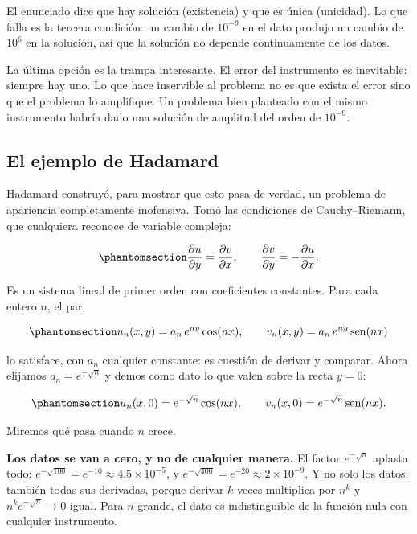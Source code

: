 \documentclass[
  spanish,
  a4paper,
]{scrbook}
\theoremstyle{definition}
\theoremstyle{plain}
\theoremstyle{definition}
\theoremstyle{plain}
\theoremstyle{definition}
\theoremstyle{remark}
\begin{document}
El enunciado dice que hay solución (existencia) y que es única
(unicidad). Lo que falla es la tercera condición: un cambio de
\(10^{-9}\) en el dato produjo un cambio de \(10^{6}\) en la solución,
así que la solución no depende continuamente de los datos.

La última opción es la trampa interesante. El error del instrumento es
inevitable: siempre hay uno. Lo que hace inservible al problema no es
que exista el error sino que el problema lo amplifique. Un problema bien
planteado con el mismo instrumento habría dado una solución de amplitud
del orden de \(10^{-9}\).

\subsection{El ejemplo de Hadamard}\label{sec-hadamard}

Hadamard construyó, para mostrar que esto pasa de verdad, un problema de
apariencia completamente inofensiva. Tomó las condiciones de
Cauchy--Riemann, que cualquiera reconoce de variable compleja:

\begin{equation}\protect\phantomsection\label{eq-cauchy-riemann}{
\frac{\partial u}{\partial y} = \frac{\partial v}{\partial x}, \qquad
\frac{\partial v}{\partial y} = -\frac{\partial u}{\partial x} .
}\end{equation}

Es un sistema lineal de primer orden con coeficientes constantes. Para
cada entero \(n\), el par

\begin{equation}\protect\phantomsection\label{eq-hadamard-sol}{
u_n(x,y) = a_n\,e^{ny}\cos(nx), \qquad v_n(x,y) = a_n\,e^{ny}\operatorname{sen}(nx)
}\end{equation}

lo satisface, con \(a_n\) cualquier constante: es cuestión de derivar y
comparar. Ahora elijamos \(a_n = e^{-\sqrt{n}}\) y demos como dato lo
que valen sobre la recta \(y=0\):

\begin{equation}\protect\phantomsection\label{eq-hadamard-dato}{
u_n(x,0) = e^{-\sqrt{n}}\cos(nx), \qquad v_n(x,0) = e^{-\sqrt{n}}\operatorname{sen}(nx) .
}\end{equation}

Miremos qué pasa cuando \(n\) crece.

\textbf{Los datos se van a cero, y no de cualquier manera.} El factor
\(e^{-\sqrt{n}}\) aplasta todo:
\(e^{-\sqrt{100}} = e^{-10} \approx 4.5\times 10^{-5}\), y
\(e^{-\sqrt{400}} = e^{-20} \approx
2\times 10^{-9}\). Y no solo los datos: también todas sus derivadas,
porque derivar \(k\) veces multiplica por \(n^k\) y
\(n^k e^{-\sqrt n} \to 0\) igual. Para \(n\) grande, el dato es
indistinguible de la función nula con cualquier instrumento.
\end{document}
